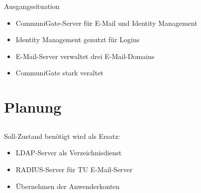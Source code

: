 \documentclass[presentation,svgnames,12pt]{beamer}
\begin{document}
\begin{frame}{Ausgangssituation}
\begin{itemize}
	\item CommuniGate-Server für E-Mail und Identity Management
	\item Identity Management genutzt für Logins
	\item E-Mail-Server verwaltet drei E-Mail-Domains%
 	\item CommuniGate stark veraltet%
\end{itemize}
\end{frame}


\section{Planung}
\subsection{}
\begin{frame}{Soll-Zustand}
benötigt wird als Ersatz:
\vspace{6pt}
\begin{itemize}
	\item LDAP-Server als Verzeichnisdienst%
	\item RADIUS-Server für TU E-Mail-Server
	\item Übernehmen der Anwenderkonten
\end{itemize}
\end{frame}
\end{document}
